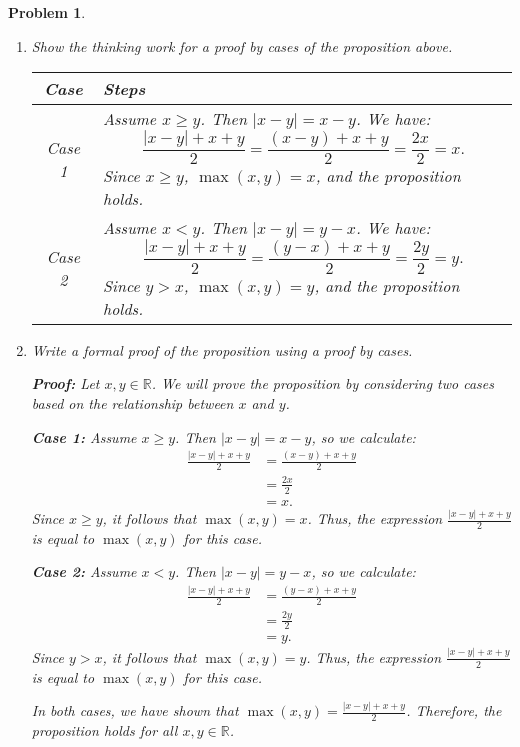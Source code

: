 \documentclass[12pt]{article}
\newtheorem{problem}{Problem}
\theoremstyle{definition}
\begin{document}
\begin{problem}
\begin{enumerate}[label=(\alph*)]
\item Show the thinking work for a proof by cases of the proposition above.

\begin{center}
    \begin{tabular}{|c|p{10cm}|}
    \hline
    \textbf{Case} & \textbf{Steps} \\
    \hline
    Case 1 & Assume \( x \geq y \). Then \( |x - y| = x - y \). We have:
    \[
    \frac{|x - y| + x + y}{2} = \frac{(x - y) + x + y}{2} = \frac{2x}{2} = x.
    \]
    Since \( x \geq y \), \( \max(x, y) = x \), and the proposition holds. \\
    \hline
    Case 2 & Assume \( x < y \). Then \( |x - y| = y - x \). We have:
    \[
    \frac{|x - y| + x + y}{2} = \frac{(y - x) + x + y}{2} = \frac{2y}{2} = y.
    \]
    Since \( y > x \), \( \max(x, y) = y \), and the proposition holds. \\
    \hline
    \end{tabular}
\end{center}

\item Write a formal proof of the proposition using a proof by cases.

\textbf{Proof:} Let \( x, y \in \mathbb{R} \). We will prove the proposition by considering two cases based on the relationship between \( x \) and \( y \).


\textbf{Case 1:} Assume \( x \geq y \). Then \( |x - y| = x - y \), so we calculate:
\[
\begin{aligned}
    \frac{|x - y| + x + y}{2} &= \frac{(x - y) + x + y}{2} \\
    &= \frac{2x}{2} \\
    &= x.
\end{aligned}
\]
Since \( x \geq y \), it follows that \( \max(x, y) = x \). Thus, the expression \( \frac{|x - y| + x + y}{2} \) is equal to \( \max(x, y) \) for this case.

\textbf{Case 2:} Assume \( x < y \). Then \( |x - y| = y - x \), so we calculate:
\[
\begin{aligned}
    \frac{|x - y| + x + y}{2} &= \frac{(y - x) + x + y}{2} \\
    &= \frac{2y}{2} \\
    &= y.
\end{aligned}
\]
Since \( y > x \), it follows that \( \max(x, y) = y \). Thus, the expression \( \frac{|x - y| + x + y}{2} \) is equal to \( \max(x, y) \) for this case.

In both cases, we have shown that \( \max(x, y) = \frac{|x - y| + x + y}{2} \). Therefore, the proposition holds for all \( x, y \in \mathbb{R} \).


\end{enumerate}
\end{problem}
\end{document}
